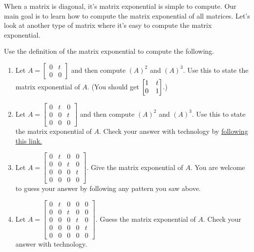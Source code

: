 When a matrix is diagonal, it's matrix exponential is simple to compute.  Our main goal is to learn how to compute the matrix exponential of all matrices. Let's look at another type of matrix where it's easy to compute the matrix exponential. 

\begin{problem}
%
 Use the definition of the matrix exponential to compute the following.
\begin{enumerate}
 \item Let $A=\begin{bmatrix}0&t\\0&0\end{bmatrix}$ and then compute $(A)^2$ and $(A)^3$.  Use this to state the matrix exponential of $A$.  (You should get $\begin{bmatrix} 1&t\\0&1 \end{bmatrix}$.)
 \item Let $A=\begin{bmatrix}0&t&0\\0&0&t\\0&0&0\end{bmatrix}$ and then compute $(A)^2$ and $(A)^3$.  Use this to state the matrix exponential of $A$. Check your answer with technology by  \href{http://bmw.byuimath.com/dokuwiki/doku.php?id=matrix_exponential_calculator}{following this link.}
 \item Let $A=\begin{bmatrix}0&t&0&0\\0&0&t&0\\0&0&0&t\\0&0&0&0\end{bmatrix}$. Give the matrix exponential of $A$. You are welcome to guess your answer by following any pattern you saw above. 
 \item Let $A=\begin{bmatrix}0&t&0&0&0\\0&0&t&0&0\\0&0&0&t&0\\0&0&0&0&t\\0&0&0&0&0\end{bmatrix}$. Guess the matrix exponential of $A$. Check your answer with technology.
\end{enumerate}
\end{problem}


